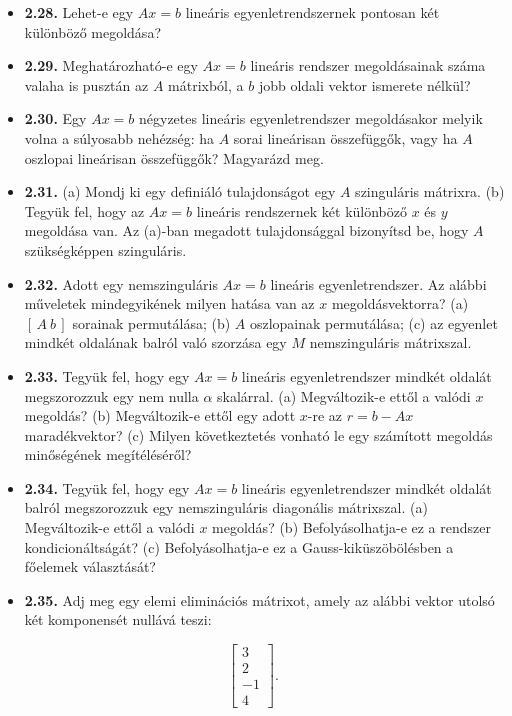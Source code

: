 \documentclass[
  magyar,
  11pt]{article}
\begin{document}
\begin{itemize}
  végzett Gauss-kiküszöbölésben a szorzótényezők abszolút értékben
  \(1\)-gyel korlátosak, ezért az egymást követő redukált mátrixok
  elemei abszolút értékben nem növekedhetnek.
\item
  \textbf{2.28.} Lehet-e egy \(Ax = b\) lineáris egyenletrendszernek
  pontosan két különböző megoldása?
\item
  \textbf{2.29.} Meghatározható-e egy \(Ax = b\) lineáris rendszer
  megoldásainak száma valaha is pusztán az \(A\) mátrixból, a \(b\) jobb
  oldali vektor ismerete nélkül?
\item
  \textbf{2.30.} Egy \(Ax = b\) négyzetes lineáris egyenletrendszer
  megoldásakor melyik volna a súlyosabb nehézség: ha \(A\) sorai
  lineárisan összefüggők, vagy ha \(A\) oszlopai lineárisan összefüggők?
  Magyarázd meg.
\item
  \textbf{2.31.} (a) Mondj ki egy definiáló tulajdonságot egy \(A\)
  szinguláris mátrixra. (b) Tegyük fel, hogy az \(Ax = b\) lineáris
  rendszernek két különböző \(x\) és \(y\) megoldása van. Az (a)-ban
  megadott tulajdonsággal bizonyítsd be, hogy \(A\) szükségképpen
  szinguláris.
\item
  \textbf{2.32.} Adott egy nemszinguláris \(Ax = b\) lineáris
  egyenletrendszer. Az alábbi műveletek mindegyikének milyen hatása van
  az \(x\) megoldásvektorra? (a) \([\,A\ b\,]\) sorainak permutálása;
  (b) \(A\) oszlopainak permutálása; (c) az egyenlet mindkét oldalának
  balról való szorzása egy \(M\) nemszinguláris mátrixszal.
\item
  \textbf{2.33.} Tegyük fel, hogy egy \(Ax = b\) lineáris
  egyenletrendszer mindkét oldalát megszorozzuk egy nem nulla \(\alpha\)
  skalárral. (a) Megváltozik-e ettől a valódi \(x\) megoldás? (b)
  Megváltozik-e ettől egy adott \(x\)-re az \(r = b - Ax\)
  maradékvektor? (c) Milyen következtetés vonható le egy számított
  megoldás minőségének megítéléséről?
\item
  \textbf{2.34.} Tegyük fel, hogy egy \(Ax = b\) lineáris
  egyenletrendszer mindkét oldalát balról megszorozzuk egy
  nemszinguláris diagonális mátrixszal. (a) Megváltozik-e ettől a valódi
  \(x\) megoldás? (b) Befolyásolhatja-e ez a rendszer kondicionáltságát?
  (c) Befolyásolhatja-e ez a Gauss-kiküszöbölésben a főelemek
  választását?
\item
  \textbf{2.35.} Adj meg egy elemi eliminációs mátrixot, amely az alábbi
  vektor utolsó két komponensét nullává teszi:
\end{itemize}

\[\begin{bmatrix} 3 \\ 2 \\ -1 \\ 4 \end{bmatrix}.\]
\end{document}
